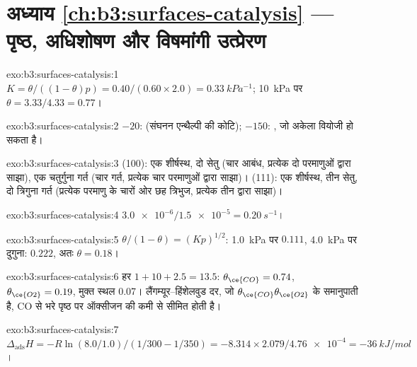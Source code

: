 \section*{अध्याय \ref{ch:b3:surfaces-catalysis} --- पृष्ठ, अधिशोषण और विषमांगी उत्प्रेरण}

\begin{solution}{exo:b3:surfaces-catalysis:1}
$K = \theta/((1 - \theta)p) = 0.40/(0.60 \times 2.0) = \qty{0.33}{kPa^{-1}}$; \qty{10}{kPa} पर $\theta = 3.33/4.33 = 0.77$।
\end{solution}

\begin{solution}{exo:b3:surfaces-catalysis:2}
$-20$:  (संघनन एन्थैल्पी की कोटि); $-150$: , जो
अकेला वियोजी हो सकता है।
\end{solution}

\begin{solution}{exo:b3:surfaces-catalysis:3}
(100): एक शीर्षस्थ, दो सेतु (चार आबंध, प्रत्येक दो परमाणुओं द्वारा साझा), एक चतुर्गुना
गर्त (चार गर्त, प्रत्येक चार परमाणुओं द्वारा साझा)। (111): एक शीर्षस्थ, तीन सेतु, दो
त्रिगुना गर्त (प्रत्येक परमाणु के चारों ओर छह त्रिभुज, प्रत्येक तीन द्वारा साझा)।
\end{solution}

\begin{solution}{exo:b3:surfaces-catalysis:4}
$\num{3.0e-6}/\num{1.5e-5} = \qty{0.20}{s^{-1}}$।
\end{solution}

\begin{solution}{exo:b3:surfaces-catalysis:5}
$\theta/(1 - \theta) = (Kp)^{1/2}$: \qty{1.0}{kPa} पर $0.111$, \qty{4.0}{kPa} पर दुगुना: $0.222$, अतः $\theta = 0.18$।
\end{solution}

\begin{solution}{exo:b3:surfaces-catalysis:6}
हर $1 + 10 + 2.5 = 13.5$: $\theta_{\ce{CO}} = 0.74$, $\theta_{\ce{O2}} = 0.19$, मुक्त स्थल 0.07।
लैंगम्यूर--हिंशेलवुड दर, जो $\theta_{\ce{CO}}\theta_{\ce{O2}}$ के समानुपाती है, CO से भरे पृष्ठ पर
ऑक्सीजन की कमी से सीमित होती है।
\end{solution}

\begin{solution}{exo:b3:surfaces-catalysis:7}
$\Delta_{\mathrm{ads}}H = -R\ln(8.0/1.0)/(1/300 - 1/350) = -8.314 \times 2.079/\num{4.76e-4} = \qty{-36}{kJ/mol}$।
\end{solution}

